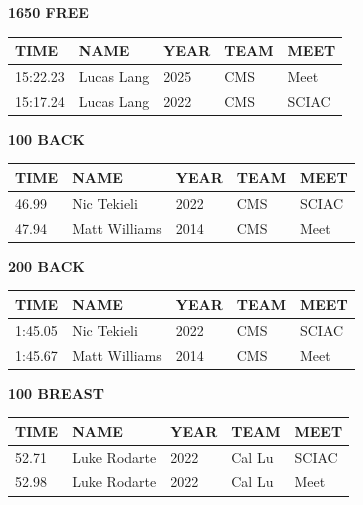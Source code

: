 \begin{table}[H]
\centering
\begin{minipage}[t]{0.48\textwidth}
\centering
\textbf{1650 FREE}\\[0.1cm]
\begin{tabular}{@{}p{1.8cm}p{2.8cm}p{1.2cm}p{1.4cm}p{1.4cm}@{}}
\hline
    \textbf{TIME} & \textbf{NAME} & \textbf{YEAR} & \textbf{TEAM} & \textbf{MEET} \\
\hline
    15:22.23 & Lucas Lang & 2025 & CMS & Meet \\
    15:17.24 & Lucas Lang & 2022 & CMS & SCIAC \\
\hline
\end{tabular}
\end{minipage}\hfill
\begin{minipage}[t]{0.48\textwidth}
\centering
\textbf{100 BACK}\\[0.1cm]
\begin{tabular}{@{}p{1.8cm}p{2.8cm}p{1.2cm}p{1.4cm}p{1.4cm}@{}}
\hline
    \textbf{TIME} & \textbf{NAME} & \textbf{YEAR} & \textbf{TEAM} & \textbf{MEET} \\
\hline
    46.99 & Nic Tekieli & 2022 & CMS & SCIAC \\
    47.94 & Matt Williams & 2014 & CMS & Meet \\
\hline
\end{tabular}
\end{minipage}
\end{table}

\begin{table}[H]
\centering
\begin{minipage}[t]{0.48\textwidth}
\centering
\textbf{200 BACK}\\[0.1cm]
\begin{tabular}{@{}p{1.8cm}p{2.8cm}p{1.2cm}p{1.4cm}p{1.4cm}@{}}
\hline
    \textbf{TIME} & \textbf{NAME} & \textbf{YEAR} & \textbf{TEAM} & \textbf{MEET} \\
\hline
    1:45.05 & Nic Tekieli & 2022 & CMS & SCIAC \\
    1:45.67 & Matt Williams & 2014 & CMS & Meet \\
\hline
\end{tabular}
\end{minipage}\hfill
\begin{minipage}[t]{0.48\textwidth}
\centering
\textbf{100 BREAST}\\[0.1cm]
\begin{tabular}{@{}p{1.8cm}p{2.8cm}p{1.2cm}p{1.4cm}p{1.4cm}@{}}
\hline
    \textbf{TIME} & \textbf{NAME} & \textbf{YEAR} & \textbf{TEAM} & \textbf{MEET} \\
\hline
    52.71 & Luke Rodarte & 2022 & Cal Lu & SCIAC \\
    52.98 & Luke Rodarte & 2022 & Cal Lu & Meet \\
\hline
\end{tabular}
\end{minipage}
\end{table}

